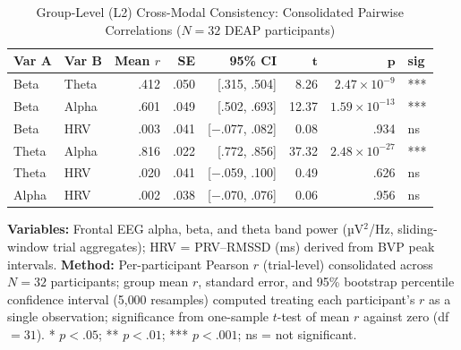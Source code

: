 \begin{table}[htbp]
    \centering
    \caption{Group-Level (L2) Cross-Modal Consistency: Consolidated Pairwise Correlations ($N = 32$ DEAP participants)}
    \label{tab:wp2_l2}
    \small
    \begin{tabular}{llrrrrrl}
        \hline
        \textbf{Var A} & \textbf{Var B} & \textbf{Mean $r$} & \textbf{SE} & \textbf{95\% CI} & $\boldsymbol{t}$ & $\boldsymbol{p}$ & \textbf{sig} \\
        \hline
        Beta  & Theta & .412 & .050 & [.315, .504] & 8.26  & $2.47\times10^{-9}$  & *** \\
        Beta  & Alpha & .601 & .049 & [.502, .693] & 12.37 & $1.59\times10^{-13}$ & *** \\
        Beta  & HRV   & .003 & .041 & [$-$.077, .082] & 0.08  & .934 & ns \\
        Theta & Alpha & .816 & .022 & [.772, .856] & 37.32 & $2.48\times10^{-27}$ & *** \\
        Theta & HRV   & .020 & .041 & [$-$.059, .100] & 0.49  & .626 & ns \\
        Alpha & HRV   & .002 & .038 & [$-$.070, .076] & 0.06  & .956 & ns \\
        \hline
    \end{tabular}
    \par\vspace{4pt}
    \noindent\parbox{\linewidth}{\scriptsize
    \textbf{Variables:} Frontal EEG alpha, beta, and theta band power (µV$^2$/Hz, sliding-window trial aggregates); HRV = \gls{PRV}--\gls{RMSSD} (ms) derived from BVP peak intervals. \textbf{Method:} Per-participant Pearson $r$ (trial-level) consolidated across $N = 32$ participants; group mean $r$, standard error, and 95\% bootstrap percentile confidence interval (5{,}000 resamples) computed treating each participant's $r$ as a single observation; significance from one-sample $t$-test of mean $r$ against zero (df $= 31$). * $p < .05$; ** $p < .01$; *** $p < .001$; ns = not significant.}
\end{table}

